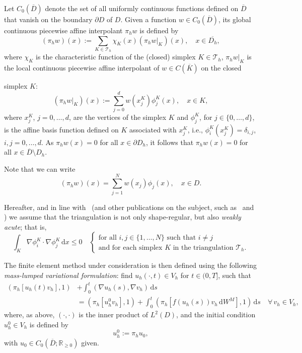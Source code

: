 \documentclass[12pt]{article}
\newcommand{\dd}{\,\mathrm{d}}
\begin{document}
Let $C_0(\overline{D})$ denote the set of all uniformly continuous functions defined on $\overline{D}$ that vanish on the boundary $\partial D$ of $D$. Given a function $w \in C_0(\overline{D})$, its  global continuous piecewise affine interpolant $\pi_h w$ is defined by
%
\begin{equation}\label{def:interpolant}
(\pi_h w)(x):= \sum_{K \in \mathcal{T}_h} \chi_K(x) (\pi_h w|_K)(x) ,\quad x \in \overline{D_h},
\end{equation}
%
where $\chi_K$ is the characteristic function of the (closed)  simplex $K \in \mathcal{T}_h$, $\pi_h w|_K$ is the local continuous piecewise affine interpolant of $w \in C(\overline{K})$ on the closed { simplex $K$: 
%
\[ (\pi_h w|_{K})(x) := \sum_{j=0}^d w(x^K_j) \phi_j^K(x),\quad x \in K,\]
%
where $x^K_j$, $j=0,\ldots, d$, are the vertices of the simplex $K$ and $\phi_j^K$, for $j\in \{0,\ldots, d\}$, is the affine basis function defined on $K$ associated with $x_j^K$, i.e., $\phi_i^K(x_j^K) = \delta_{i,j}$, $i, j=0,\ldots,d$. As $\pi_h w(x)=0$ for all $x \in \partial{D_h}$, it follows that $\pi_h w(x)=0$ for all $x \in \overline D \setminus D_h$.
%

Note that we can write
\begin{equation}
    (\pi_h w)(x) = \sum_{j=1}^N w(x_j) \phi_j(x), \quad x \in D.
\end{equation}

Hereafter, and in line with~\cite{fujii1973some} (and other publications on the subject, such as~\cite{thomee2015positivity} and \cite{MR4900691}) we assume that the triangulation is not only shape-regular, but also \emph{weakly acute}; that is, 
%
\[\int_  K \nabla \phi^K_i \cdot \nabla \phi^K_j \dd x \leq 0\quad \left\{
\begin{array}{ll}
\mbox{for all $i,j \in 
\{1,\ldots,N\}$ such that $i \neq j$}\\ 
\mbox{and for each simplex $K$ in the triangulation $\mathcal{T}_h$.}
\end{array}
\right.
\] 

 
The  finite element method under consideration is then defined using the following \emph{mass-lumped variational formulation}: find $u_h(\cdot,t) \in V_h$ for $t \in (0,T]$, such that
%
\begin{equation}\label{ML-FEM_formulation}
    \begin{aligned}
(\pi_h[u_h(t) v_h], 1) &+ \int_0^t (\nabla u_h(s) , \nabla v_h) \dd s \\ 
& = (\pi_h[u_h^0 v_h], 1) + \int_0^t (\pi_h [f(u_h(s)) v_h \dd W^M], 1) \dd s\quad \forall\,   v_h \in V_h,
\end{aligned}
\end{equation}
%
where, as above, $(\cdot,\cdot)$ is the inner product of $L^2(D)$, and the initial condition $u_h^0 \in V_h$ is defined by
%
\[u_h^0:= \pi_h u_0,\] 
%
with $u_0 \in C_0(\overline{D};\mathbb{R}_{\geq 0})$ given.


}
\end{document}
